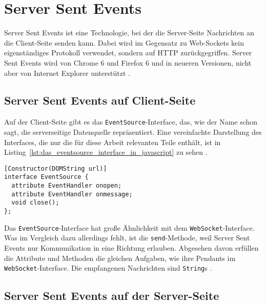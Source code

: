 
\section{Server Sent Events} %
\label{sec:server_sent_events}

Server Sent Events ist eine Technologie, bei der die Server-Seite Nachrichten an die Client-Seite senden kann.
Dabei wird im Gegensatz zu Web-Sockets kein eigenständiges Protokoll verwendet, sondern auf HTTP zurückgegriffen.
Server Sent Events wird von Chrome 6 und Firefox 6 und in neueren Versionen, nicht aber von Internet Explorer unterstützt \cite[vgl.][]{js_eventsource_compatibility}.

\subsection{Server Sent Events auf Client-Seite} %
\label{sub:server_sent_events_auf_client_seite}

Auf der Client-Seite gibt es das \lstinline|EventSource|-Interface, das, wie der Name schon sagt, die serverseitige Datenquelle repräsentiert.
Eine vereinfachte Darstellung des Interfaces, die nur die für diese Arbeit relevanten Teile enthält, ist in Listing~\ref{lst:das_eventsource_interface_in_javascript} zu sehen \cite[vgl.][]{js_eventsource}.

\begin{lstlisting}[caption=Das EventSource-Interface in JavaScript, label=lst:das_eventsource_interface_in_javascript]
[Constructor(DOMString url)]
interface EventSource {
  attribute EventHandler onopen;
  attribute EventHandler onmessage;
  void close();
};
\end{lstlisting}

Das \lstinline|EventSource|-Interface hat große Ähnlichkeit mit dem \lstinline|WebSocket|-Interface.
Was im Vergleich dazu allerdings fehlt, ist die \lstinline|send|-Methode, weil Server Sent Events nur Kommunikation in eine Richtung erlauben.
Abgesehen davon erfüllen die Attribute und Methoden die gleichen Aufgaben, wie ihre Pendants im \lstinline|WebSocket|-Interface.
Die empfangenen Nachrichten sind \lstinline|String|s \cite[vgl.][]{js_eventsource}.


\subsection{Server Sent Events auf der Server-Seite} %
\label{sub:server_sent_events_auf_der_server_seite}

